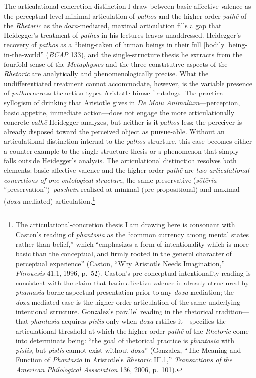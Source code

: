 The articulational-concretion distinction I draw between basic affective valence as the perceptual-level minimal articulation of \textit{pathos} and the higher-order \textit{pathē} of the \textit{Rhetoric} as the \textit{doxa}-mediated, maximal articulation fills a gap that Heidegger's treatment of \textit{pathos} in his lectures leaves unaddressed. Heidegger's recovery of \textit{pathos} as a ``being-taken of human beings in their full [bodily] being-in-the-world'' (\textit{BCAP} 133), and the single-structure thesis he extracts from the fourfold sense of the \textit{Metaphysics} and the three constitutive aspects of the \textit{Rhetoric} are analytically and phenomenologically precise. What the undifferentiated treatment cannot accommodate, however, is the variable presence of \textit{pathos} across the action-types Aristotle himself catalogs. The practical syllogism of drinking that Aristotle gives in \textit{De Motu Animalium}---perception, basic appetite, immediate action---does not engage the more articulationally concrete \textit{pathē} Heidegger analyzes, but neither is it \textit{pathos}-less: the perceiver is already disposed toward the perceived object as pursue-able. Without an articulational distinction internal to the \textit{pathos}-structure, this case becomes either a counter-example to the single-structure thesis or a phenomenon that simply falls outside Heidegger's analysis. The articulational distinction resolves both elements: basic affective valence and the higher-order \textit{pathē} are \textit{two articulational concretions of one ontological structure}, the same preservative  (\textit{sōtēria} ``preservation'')--\textit{paschein} realized at minimal (pre-propositional) and maximal (\textit{doxa}-mediated) articulation.\footnote{The articulational-concretion thesis I am drawing here is consonant with Caston's reading of \textit{phantasia} as the ``common currency among mental states rather than belief,'' which ``emphasizes a form of intentionality which is more basic than the conceptual, and firmly rooted in the general character of perceptual experience'' (Caston, ``Why Aristotle Needs Imagination,'' \textit{Phronesis} 41.1, 1996, p.~52). Caston's pre-conceptual-intentionality reading is consistent with the claim that basic affective valence is already structured by \textit{phantasia}-borne aspectual presentation prior to any \textit{doxa}-mediation; the \textit{doxa}-mediated case is the higher-order articulation of the same underlying intentional structure. Gonzalez's parallel reading in the rhetorical tradition---that \textit{phantasia} acquires \textit{pistis} only when \textit{doxa} ratifies it---specifies the articulational threshold at which the higher-order \textit{pathē} of the \textit{Rhetoric} come into determinate being: ``the goal of rhetorical practice is \textit{phantasia} with \textit{pistis}, but \textit{pistis} cannot exist without \textit{doxa}'' (Gonzalez, ``The Meaning and Function of \textit{Phantasia} in Aristotle's \textit{Rhetoric} III.1,'' \textit{Transactions of the American Philological Association} 136, 2006, p.~101).}

